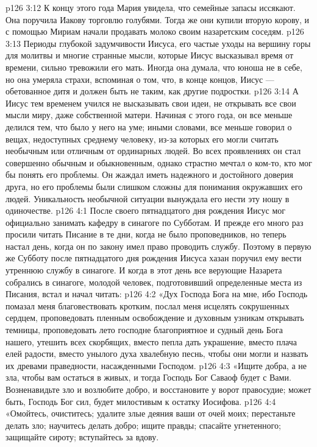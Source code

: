 \vs p126 3:12 \pc К концу этого года Мария увидела, что семейные запасы иссякают. Она поручила Иакову торговлю голубями. Тогда же они купили вторую корову, и с помощью Мириам начали продавать молоко своим назаретским соседям.
\vs p126 3:13 \pc Периоды глубокой задумчивости Иисуса, его частые уходы на вершину горы для молитвы и многие странные мысли, которые Иисус высказывал время от времени, сильно тревожили его мать. Иногда она думала, что юноша не в себе, но она умеряла страхи, вспоминая о том, что, в конце концов, Иисус --- обетованное дитя и должен быть не таким, как другие подростки.
\vs p126 3:14 А Иисус тем временем учился не высказывать свои идеи, не открывать все свои мысли миру, даже собственной матери. Начиная с этого года, он все меньше делился тем, что было у него на уме; иными словами, все меньше говорил о вещах, недоступных среднему человеку, из\hyp{}за которых его могли считать необычным или отличным от ординарных людей. Во всех проявлениях он стал совершенно обычным и обыкновенным, однако страстно мечтал о ком\hyp{}то, кто мог бы понять его проблемы. Он жаждал иметь надежного и достойного доверия друга, но его проблемы были слишком сложны для понимания окружавших его людей. Уникальность необычной ситуации вынуждала его нести эту ношу в одиночестве.
\vs p126 4:1 После своего пятнадцатого дня рождения Иисус мог официально занимать кафедру в синагоге по Субботам. И прежде его много раз просили читать Писание в те дни, когда не было проповедников, но теперь настал день, когда он по закону имел право проводить службу. Поэтому в первую же Субботу после пятнадцатого дня рождения Иисуса хазан поручил ему вести утреннюю службу в синагоге. И когда в этот день все верующие Назарета собрались в синагоге, молодой человек, подготовивший определенные места из Писания, встал и начал читать:
\vs p126 4:2 \pc «Дух Господа Бога на мне, ибо Господь помазал меня благовествовать кротким, послал меня исцелять сокрушенных сердцем, проповедовать пленным освобождение и духовным узникам открывать темницы, проповедовать лето господне благоприятное и судный день Бога нашего, утешить всех скорбящих, вместо пепла дать украшение, вместо плача елей радости, вместо унылого духа хвалебную песнь, чтобы они могли и назвать их древами праведности, насажденными Господом.
\vs p126 4:3 «Ищите добра, а не зла, чтобы вам остаться в живых, и тогда Господь Бог Саваоф будет с Вами. Возненавидьте зло и возлюбите добро, и восстановите у ворот правосудие; может быть, Господь Бог сил, будет милостивым к остатку Иосифова.
\vs p126 4:4 «Омойтесь, очиститесь; удалите злые деяния ваши от очей моих; перестаньте делать зло; научитесь делать добро; ищите правды; спасайте угнетенного; защищайте сироту; вступайтесь за вдову.
